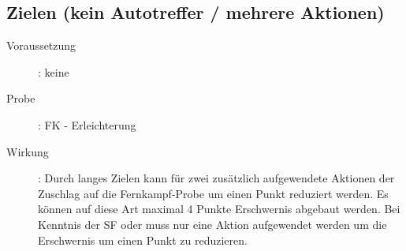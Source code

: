 \subsection{Zielen (kein Autotreffer / mehrere Aktionen)}
\label{fernkampf.zielen}
\begin{description}
    \item[Voraussetzung]:
        keine
    \item[Probe]:
        FK - Erleichterung
    \item[Wirkung]:
        Durch langes Zielen kann für zwei zusätzlich aufgewendete Aktionen der Zuschlag auf die Fernkampf-Probe um einen Punkt reduziert werden.
        Es können auf diese Art maximal 4 Punkte Erschwernis abgebaut werden.
        Bei Kenntnis der SF  oder  muss nur eine Aktion aufgewendet werden um die Erschwernis um einen Punkt zu reduzieren.
\end{description}
